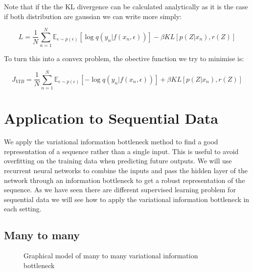 \documentclass[10pt,oneside,openright]{report}
\begin{document}
Note that if the the KL divergence can be calculated analytically as it is the case if both distribution are gaussian we can write more simply:

 $$ L = \frac{1}{N}  \sum_{n=1}^{N} \mathbb{E}_{\epsilon \sim p(\epsilon)}[\log q(y_{n} |f(x_{n}, \epsilon))] - \beta KL[p(Z|x_{n}), r(Z)]$$

To turn this into a convex problem, the obective function we try to minimise is:

 $$ J_{VIB} = \frac{1}{N}  \sum_{n=1}^{N} \mathbb{E}_{\epsilon \sim p(\epsilon)}[- \log q(y_{n} |f(x_{n}, \epsilon))] + \beta KL[p(Z|x_{n}), r(Z)]$$


\section{Application to Sequential Data}

We apply the variational information bottleneck method to find a good representation of a sequence rather than a single input. This is useful to avoid overfitting on the training data when predicting future outputs. We will use recurrent neural networks to combine the inputs and pass the hidden layer of the network through an information bottleneck to get a robust representation of the sequence. As we have seen there are different supervised learning problem for sequential data we will see how to apply the variational information bottleneck in each setting.

\subsection{Many to many}
\begin{figure}[H]
\centering
{}
\caption{Graphical model of many to many variational information bottleneck}
\end{figure}
\end{document}
